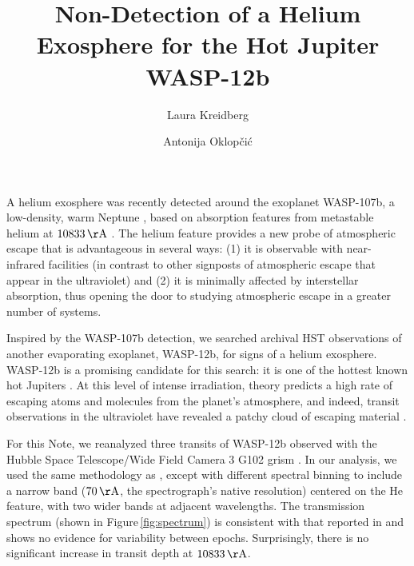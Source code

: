 \documentclass[RNAAS]{aastex62}
\begin{document}
\title{Non-Detection of a Helium Exosphere for the Hot Jupiter WASP-12b}


\author{Laura Kreidberg}

\author{Antonija Oklop\v{c}i\'{c}}
A helium exosphere was recently detected around the exoplanet WASP-107b, a
low-density, warm Neptune \citep{spake18}, based on absorption features from metastable helium at $10833\,\mathrm{\AA}$ \citep[predicted
by][]{seager00,oklopcic18}. The helium feature provides a new probe of atmospheric escape that is
advantageous in several ways: (1) it is observable with near-infrared facilities
(in contrast to other signposts of atmospheric escape that appear in the
ultraviolet) and (2) it is minimally affected by interstellar absorption, thus opening the door to studying atmospheric escape in a greater number of systems.

Inspired by the WASP-107b detection, we searched archival HST observations of
another evaporating exoplanet, WASP-12b, for signs of a helium exosphere.
WASP-12b is a promising 
candidate for this search: it is one of the hottest known hot
Jupiters \citep[$T_\mathrm{eq} = 2500$ K;][]{hebb09}. At this level of intense irradiation, theory predicts a high rate of escaping atoms and molecules from the planet's atmosphere, and indeed, transit observations in the ultraviolet have revealed a patchy cloud of escaping material \citep{nichols15}.  

For this Note, we reanalyzed three transits of WASP-12b observed with the
Hubble Space Telescope/Wide Field Camera 3 G102 grism \citep[originally published in][]{kreidberg15b}.  In our analysis, we used the same methodology as
\cite{kreidberg15b}, except with different spectral binning to include a narrow
band ($70\,\mathrm{\AA}$, the spectrograph's native resolution) centered on the
He feature, with two wider bands at adjacent wavelengths. 
The transmission spectrum (shown in Figure\,\ref{fig:spectrum}) is consistent with that reported in
\cite{kreidberg15b} and shows no evidence for variability between epochs.  Surprisingly, there
is no significant increase in transit depth at $10833\,\mathrm{\AA}$.  
\end{document}
